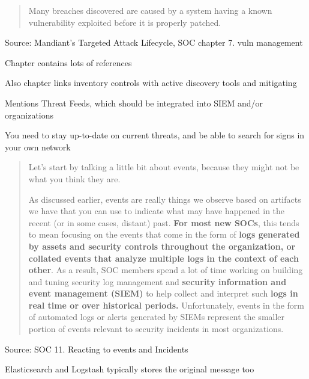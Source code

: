 \documentclass[Screen16to9,17pt]{foils}
\begin{document}

\begin{quote}
Many breaches discovered are caused by a system having a known vulnerability exploited before it is properly patched.
\end{quote}

Source: Mandiant’s Targeted Attack Lifecycle, SOC chapter 7. vuln management

\begin{list2}
\item Chapter contains lots of references
\item Also chapter links inventory controls with active discovery tools and mitigating
\item Mentions Threat Feeds, which should be integrated into SIEM and/or organizations
\item You need to stay up-to-date on current threats, and be able to search for signs in your own network
\end{list2}




\begin{quote}
Let’s start by talking a little bit about events, because they might not be what you think they are.

As discussed earlier, events are really things we observe based on artifacts we have that you can use to indicate what may have happened in the recent (or in some cases, distant) past. {\bf For most new SOCs}, this tends to mean focusing on the events that come in the form of {\bf logs generated by assets and security controls throughout the organization, or collated events that analyze multiple logs in the context of each other}. As a result, SOC members spend a lot of time working on building and tuning security log management and {\bf security information and event management (SIEM)} to help collect and interpret such {\bf logs in real time or over historical periods.} Unfortunately, events in the form of automated logs or alerts generated by SIEMs represent the smaller portion of events relevant to security incidents in most organizations.
\end{quote}
Source:  SOC 11. Reacting to events and Incidents

\begin{list2}
\item Elasticsearch and Logstash typically stores the original message too
\end{list2}
\end{document}
